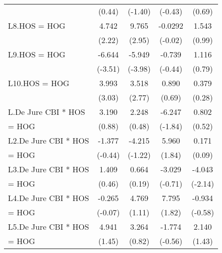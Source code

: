 {\begin{tabular}{l*{4}{c}}
                    &      (0.44)         &     (-1.40)         &     (-0.43)         &      (0.69)         \\
[1em]
L8.HOS = HOG        &       4.742\sym{*}  &       9.765\sym{**} &     -0.0292         &       1.543         \\
                    &      (2.22)         &      (2.95)         &     (-0.02)         &      (0.99)         \\
[1em]
L9.HOS = HOG        &      -6.644\sym{***}&      -5.949\sym{***}&      -0.739         &       1.116         \\
                    &     (-3.51)         &     (-3.98)         &     (-0.44)         &      (0.79)         \\
[1em]
L10.HOS = HOG       &       3.993\sym{**} &       3.518\sym{**} &       0.890         &       0.379         \\
                    &      (3.03)         &      (2.77)         &      (0.69)         &      (0.28)         \\
[1em]
L.De Jure CBI * HOS &       3.190         &       2.248         &      -6.247         &       0.802         \\
= HOG               &      (0.88)         &      (0.48)         &     (-1.84)         &      (0.52)         \\
[1em]
L2.De Jure CBI * HOS&      -1.377         &      -4.215         &       5.960         &       0.171         \\
= HOG               &     (-0.44)         &     (-1.22)         &      (1.84)         &      (0.09)         \\
[1em]
L3.De Jure CBI * HOS&       1.409         &       0.664         &      -3.029         &      -4.043\sym{*}  \\
= HOG               &      (0.46)         &      (0.19)         &     (-0.71)         &     (-2.14)         \\
[1em]
L4.De Jure CBI * HOS&      -0.265         &       4.769         &       7.795         &      -0.934         \\
= HOG               &     (-0.07)         &      (1.11)         &      (1.82)         &     (-0.58)         \\
[1em]
L5.De Jure CBI * HOS&       4.941         &       3.264         &      -1.774         &       2.140         \\
= HOG               &      (1.45)         &      (0.82)         &     (-0.56)         &      (1.43)         \\

\end{tabular}}
